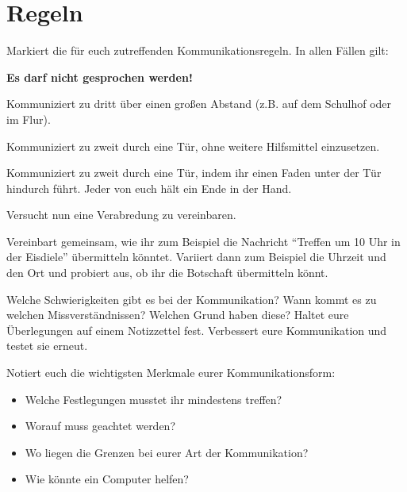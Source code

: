 \documentclass[10pt, a4paper]{arbeitsblatt}
\begin{document}
\ReiheTitel

\section*{Regeln}
Markiert die für euch zutreffenden Kommunikationsregeln. In allen Fällen gilt:

\begin{infobox}\begin{center}
	\textbf{Es darf nicht gesprochen werden!}
\end{center}\end{infobox}

\begin{enuma}
	\item Kommuniziert zu dritt über einen großen Abstand (z.B. auf dem Schulhof oder im Flur).
	\item Kommuniziert zu zweit durch eine Tür, ohne weitere Hilfsmittel einzusetzen.
	\item Kommuniziert zu zweit durch eine Tür, indem ihr einen Faden unter der Tür hindurch führt. Jeder von euch hält ein Ende in der Hand.
\end{enuma}

\begin{aufgabe}
	Versucht nun eine Verabredung zu vereinbaren.

	\begin{teilaufgaben}
		\teilaufgabe
		Vereinbart gemeinsam, wie ihr zum Beispiel die Nachricht \enquote{Treffen um 10 Uhr in der Eisdiele} übermitteln könntet.
		\teilaufgabe
		Variiert dann zum Beispiel die Uhrzeit und den Ort und probiert aus, ob ihr die Botschaft übermitteln könnt.
	\end{teilaufgaben}
\end{aufgabe}

\begin{aufgabe}
	\begin{teilaufgaben}
		\teilaufgabe
		Welche Schwierigkeiten gibt es bei der Kommunikation? Wann kommt es zu welchen Missverständnissen? Welchen Grund haben diese? Haltet eure Überlegungen auf einem Notizzettel fest.
		\teilaufgabe
		Verbessert eure Kommunikation und testet sie erneut.
	\end{teilaufgaben}
\end{aufgabe}


\begin{aufgabe}
	Notiert euch die wichtigsten Merkmale eurer Kommunikationsform:
	\begin{itemize}
		\item Welche Festlegungen musstet ihr mindestens treffen?
		\item Worauf muss geachtet werden?
		\item Wo liegen die Grenzen bei eurer Art der Kommunikation?
		\item Wie könnte ein Computer helfen?
	\end{itemize}
\end{aufgabe}
\end{document}
